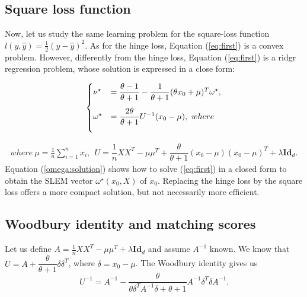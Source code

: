 \subsection{Square loss function}\label{SLEM}
Now, let us study the same learning problem for the square-loss function $l(y,\hat{y}) = \frac{1}{2}(y-\hat{y})^2$. As for the hinge loss, Equation (\ref{eq:first}) is a convex problem. 
However, differently from the hinge loss, Equation (\ref{eq:first}) is a ridgr regression problem, whose solution is expressed in a close form:

\begin{align}
\begin{cases}
\vspace{3 mm}
\nu^\star &= \dfrac{\theta-1}{\theta+1}-\dfrac{1}{\theta+1}(\theta x_0+\mu)^T\omega^\star,\\
\vspace{3 mm}
\omega^\star &= \dfrac{2\theta}{\theta+1}U^{-1}(x_0-\mu), \ where \\
\end{cases}
\label{omega:solution}
\end{align}

\begin{align}
where \ \mu = \frac{1}{n}\sum_{i=1}^n x_i, \ \ U = \dfrac{1}{n}XX^T-\mu\mu^T+\dfrac{\theta}{\theta+1}(x_0-\mu)(x_0-\mu)^T+\lambda\textbf{Id}_d.
\end{align}
Equation (\ref{omega:solution}) shows how to solve (\ref{eq:first}) in a closed form to obtain the SLEM vector $\omega^\star(x_0,X)$ of $x_0$. 
Replacing the hinge loss by the square loss offers a more compact solution, but not necessarily more efficient.

\subsection{Woodbury identity and matching scores}
Let us define $A = \frac{1}{n}XX^T-\mu\mu^T +\lambda\textbf{Id}_d$ and assume $A^{-1}$ known. 
We know that $U = A + \dfrac{\theta}{\theta+1}\delta\delta^T$, where $\delta=x_0-\mu$. The Woodbury identity \cite{woodbury} gives us
\begin{equation}
U^{-1} = A^{-1} -\dfrac{\theta}{\theta\delta^TA^{-1}\delta+ \theta+1}A^{-1}\delta^T\delta A^{-1}. \label{invU}
\end{equation}

